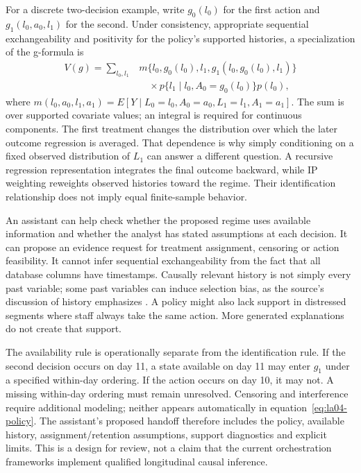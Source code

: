 For a discrete two-decision example, write
$g_0(l_0)$ for the first action and
$g_1(l_0,a_0,l_1)$ for the second. Under consistency, appropriate sequential
exchangeability and positivity for the policy's supported histories, a
specialization of the g-formula is
\begin{align}
 V(g)=\sum_{l_0,l_1}&
 m\{l_0,g_0(l_0),l_1,g_1(l_0,g_0(l_0),l_1)\}\nonumber\\
 &\quad\times p\{l_1\mid l_0,A_0=g_0(l_0)\}p(l_0),
 \label{eq:la04-policy}
\end{align}
where $m(l_0,a_0,l_1,a_1)=E[Y\mid L_0=l_0,A_0=a_0,L_1=l_1,A_1=a_1]$.
The sum is over supported covariate values; an integral is required for
continuous components. The first treatment changes the distribution over which
the later outcome regression is averaged. That dependence is why simply
conditioning on a fixed observed distribution of $L_1$ can answer a different
question. A recursive regression representation integrates the final outcome
backward, while IP weighting reweights observed histories toward the regime.
Their identification relationship does not imply equal finite-sample behavior.

An assistant can help check whether the proposed regime uses available
information and whether the analyst has stated assumptions at each decision.
It can propose an evidence request for treatment assignment, censoring or action
feasibility. It cannot infer sequential exchangeability from the fact that all
database columns have timestamps. Causally relevant history is not simply every
past variable; some past variables can induce selection bias, as the source's
discussion of history emphasizes \cite{hernan2020}. A policy might also lack
support in distressed segments where staff always take the same action.
More generated explanations do not create that support.

The availability rule is operationally separate from the identification rule.
If the second decision occurs on day 11, a state available on day 11 may enter
$g_1$ under a specified within-day ordering. If the action occurs on day 10, it
may not. A missing within-day ordering must remain unresolved. Censoring and
interference require additional modeling; neither appears automatically in
equation~\eqref{eq:la04-policy}. The assistant's proposed handoff therefore
includes the policy, available history, assignment/retention assumptions,
support diagnostics and explicit limits. This is a design for review, not a
claim that the current orchestration frameworks implement qualified
longitudinal causal inference.

